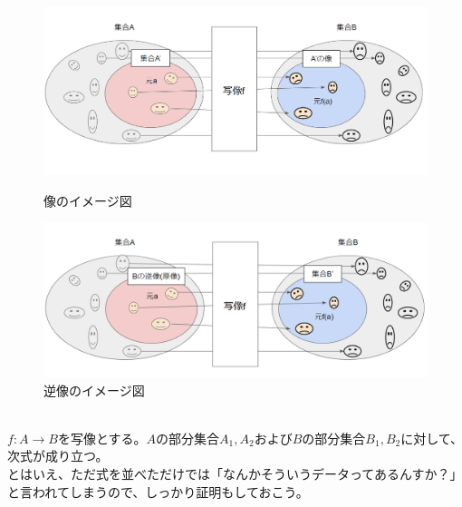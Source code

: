 \documentclass[a4j,dvipdfmx]{jsarticle}
\begin{document}
\begin{figure}[h]
    \begin{minipage}{0.5\linewidth}
        \centering
        \includegraphics[keepaspectratio,scale=0.35]{img/写像_像.png}
        \caption{像のイメージ図}
      \end{minipage}
      \begin{minipage}{0.6\linewidth}
        \centering
        \includegraphics[keepaspectratio, scale=0.35]{img/写像_逆増.png}
        \caption{逆像のイメージ図}
      \end{minipage}
\end{figure}
\hrulefill\\
$f:A\to B$を写像とする。$A$の部分集合$A_1,A_2$および$B$の部分集合$B_1,B_2$に対して、次式が成り立つ。
\\%

とはいえ、ただ式を並べただけでは「なんかそういうデータってあるんすか？」と言われてしまうので、しっかり証明もしておこう。
\end{document}
